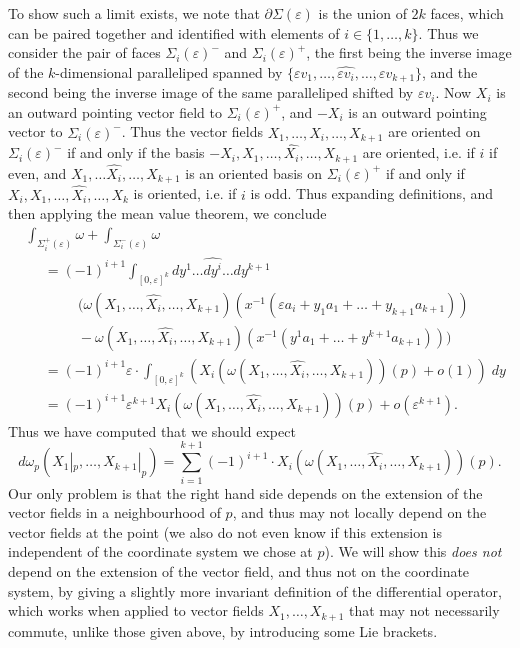 To show such a limit exists, we note that $\partial \Sigma(\varepsilon)$ is the union of $2k$ faces, which can be paired together and identified with elements of $i \in \{1, \dots, k \}$. Thus we consider the pair of faces $\Sigma_i(\varepsilon)^-$ and $\Sigma_i(\varepsilon)^+$, the first being the inverse image of the $k$-dimensional paralleliped spanned by $\{ \varepsilon v_1, \dots, \widehat{\varepsilon v_i}, \dots, \varepsilon v_{k+1} \}$, and the second being the inverse image of the same paralleliped shifted by $\varepsilon v_i$. Now $X_i$ is an outward pointing vector field to $\Sigma_i(\varepsilon)^+$, and $-X_i$ is an outward pointing vector to $\Sigma_i(\varepsilon)^-$. Thus the vector fields $X_1, \dots, \widehat{X_i}, \dots, X_{k+1}$ are oriented on $\Sigma_i(\varepsilon)^-$ if and only if the basis $-X_i,X_1, \dots, \widehat{X_i}, \dots, X_{k+1}$ are oriented, i.e. if $i$ if even, and $X_1, \dots \widehat{X_i}, \dots, X_{k+1}$ is an oriented basis on $\Sigma_i(\varepsilon)^+$ if and only if $X_i,X_1, \dots, \widehat{X_i}, \dots, X_k$ is oriented, i.e. if $i$ is odd. Thus expanding definitions, and then applying the mean value theorem, we conclude
%
\begin{align*}
    &\int_{\Sigma_i^+(\varepsilon)} \omega + \int_{\Sigma_i^-(\varepsilon)} \omega\\
    &\ \ \ \ \ \ = (-1)^{i+1} \int_{[0,\varepsilon]^k} dy^1 \dots \widehat{dy^i} \dots dy^{k+1}\\
    &\ \ \ \ \ \ \ \ \ \ \ \ \ \ \ \ \ \Bigg( \omega(X_1, \dots, \widehat{X_i},\dots, X_{k+1})(x^{-1}(\varepsilon a_i + y_1 a_1 + \dots + y_{k+1} a_{k+1}))\\
    &\ \ \ \ \ \ \ \ \ \ \ \ \ \ \ \ \ - \omega(X_1,\dots,\widehat{X_i},\dots,X_{k+1})(x^{-1}(y^1a_1 + \dots + y^{k+1}a_{k+1})) \Bigg)\\
    &\ \ \ \ \ \ = (-1)^{i+1} \varepsilon \cdot \int_{[0,\varepsilon]^k} \left( X_i(\omega(X_1, \dots, \widehat{X_i}, \dots, X_{k+1}))(p) + o(1) \right)\; dy\\
    &\ \ \ \ \ \ = (-1)^{i+1} \varepsilon^{k+1} X_i(\omega(X_1, \dots, \widehat{X_i}, \dots, X_{k+1}))(p) + o(\varepsilon^{k+1}).
\end{align*}
%
Thus we have computed that we should expect
%
\[ d\omega_p(X_1|_p, \dots, X_{k+1}|_p) = \sum_{i = 1}^{k+1} (-1)^{i+1} \cdot X_i(\omega(X_1, \dots, \widehat{X_i}, \dots, X_{k+1}))(p). \]
%
Our only problem is that the right hand side depends on the extension of the vector fields in a neighbourhood of $p$, and thus may not locally depend on the vector fields at the point (we also do not even know if this extension is independent of the coordinate system we chose at $p$). We will show this \emph{does not} depend on the extension of the vector field, and thus not on the coordinate system, by giving a slightly more invariant definition of the differential operator, which works when applied to vector fields $X_1, \dots, X_{k+1}$ that may not necessarily commute, unlike those given above, by introducing some Lie brackets.

